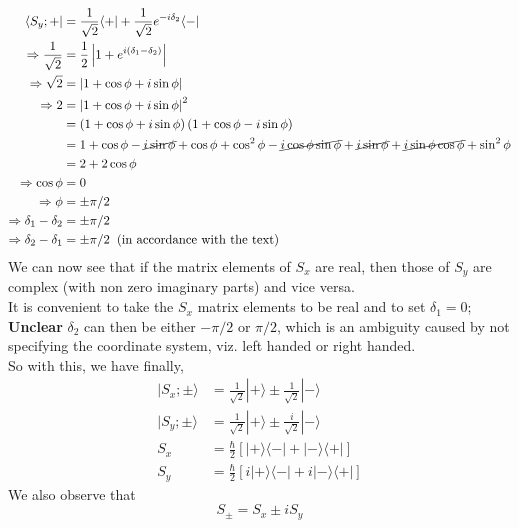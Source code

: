 \documentclass[12pt]{article}
\def\bra#1{\langle#1|}
\def\ket#1{|#1 \rangle}
\def\oupr#1#2{| #1 \rangle \langle #2 |}
\begin{document}
				\begin{align}
					\bra {S_y; +} &= \frac 1 {\sqrt 2} \bra + + \frac 1 {\sqrt 2} e^{-i\delta_2} \bra {-} \\
					\Rightarrow \frac 1 {\sqrt 2} 	&= 	\frac 1 2 \left|  1 + e^{i(\delta_1 - \delta_2)}\right| \\
					\Rightarrow \sqrt 2 			&=	\left| 1 + \cos \phi + i\sin \phi \right|\\
					\Rightarrow 2 					&=  \left| 1 + \cos \phi + i\sin \phi \right| ^ 2\\
								 					&=  \left( 1 + \cos \phi + i\sin \phi \right) \left( 1 + \cos \phi - i\sin \phi \right) \\
								 					&=  1 + \cos \phi - \cancel{i\sin\phi} + \cos \phi + \cos^2\phi - \cancel{i \cos\phi\sin\phi} + \cancel{i\sin\phi} + \cancel{i \sin \phi\cos\phi} + \sin^2\phi\\
								 					&=2 + 2\cos\phi \\
					\Rightarrow \cos \phi 			&= 0 \\
					\Rightarrow \phi 				&= \pm \pi/2 \\
					\Rightarrow \delta_1 - \delta_2 &= \pm \pi/2 \\
					\Rightarrow \delta_2 - \delta_1 &= \pm \pi/2 \;\; \text{(in accordance with the text)}
				\end{align}
				We can now see that if the matrix elements of $S_x$ are real, then those of $S_y$ are complex (with non zero imaginary parts) and vice versa.\\
				It is convenient to take the $S_x$ matrix elements to be real and to set $\delta_1=0$;\\
				{\bf Unclear} $\delta_2$ can then be either $-\pi/2$ or $\pi/2$, which is an ambiguity caused by not specifying the coordinate system, viz. left handed or right handed.\\
				So with this, we have finally,
				\begin{align}
					\ket {S_x;\pm} &= \frac 1 {\sqrt 2} \ket + \pm \frac 1 {\sqrt 2} \ket - \\
					\ket {S_y;\pm} &= \frac 1 {\sqrt 2} \ket + \pm \frac i {\sqrt 2} \ket - \\					
					S_x &= \frac \hbar 2 \left[ \oupr + - + \oupr - + \right]\\
					S_y &= \frac \hbar 2 \left[ i\oupr + - + i\oupr - + \right]
				\end{align}
				We also observe that 
				\begin{equation}
					S_{\pm} = S_x \pm iS_y
				\end{equation}
\end{document}
